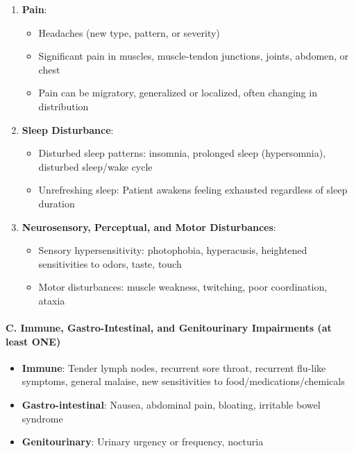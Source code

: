 \begin{requirement}
\begin{enumerate}
    \item \textbf{Pain}:
    \begin{itemize}
        \item Headaches (new type, pattern, or severity)
        \item Significant pain in muscles, muscle-tendon junctions, joints, abdomen, or chest
        \item Pain can be migratory, generalized or localized, often changing in distribution
    \end{itemize}

    \item \textbf{Sleep Disturbance}:
    \begin{itemize}
        \item Disturbed sleep patterns: insomnia, prolonged sleep (hypersomnia), disturbed sleep/wake cycle
        \item Unrefreshing sleep: Patient awakens feeling exhausted regardless of sleep duration
    \end{itemize}

    \item \textbf{Neurosensory, Perceptual, and Motor Disturbances}:
    \begin{itemize}
        \item Sensory hypersensitivity: photophobia, hyperacusis, heightened sensitivities to odors, taste, touch
        \item Motor disturbances: muscle weakness, twitching, poor coordination, ataxia
    \end{itemize}
\end{enumerate}

\paragraph{C. Immune, Gastro-Intestinal, and Genitourinary Impairments (at least ONE)}

\begin{itemize}
    \item \textbf{Immune}: Tender lymph nodes, recurrent sore throat, recurrent flu-like symptoms, general malaise, new sensitivities to food/medications/chemicals
    \item \textbf{Gastro-intestinal}: Nausea, abdominal pain, bloating, irritable bowel syndrome
    \item \textbf{Genitourinary}: Urinary urgency or frequency, nocturia
\end{itemize}


\end{requirement}
